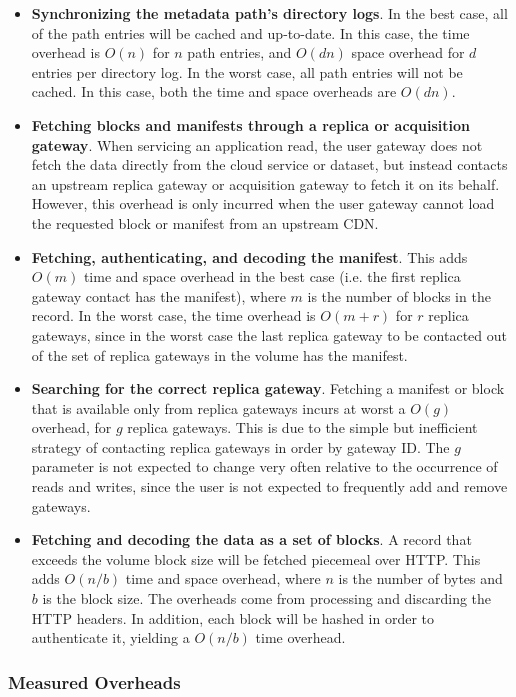 \begin{itemize}
\item \textbf{Synchronizing the metadata path's directory logs}.
In the best case, all of the path entries will be cached and up-to-date.  In
this case, the time overhead is $O(n)$ for $n$ path entries, and $O(dn)$ space
overhead for $d$ entries per directory log.  In the worst case,
all path entries will not be cached.  In this case, both the time and space
overheads are $O(dn)$.
\item \textbf{Fetching blocks and manifests through a replica or acquisition gateway}.  When
servicing an application read, the user gateway does not fetch the data directly
from the cloud service or dataset, but instead contacts an upstream replica
gateway or acquisition gateway to
fetch it on its behalf.  However, this overhead is only
incurred when the user gateway cannot load the requested block or manifest from
an upstream CDN.
\item \textbf{Fetching, authenticating, and decoding the manifest}.
This adds $O(m)$ time and space overhead in the best case (i.e. the first
replica gateway contact has the manifest),
where $m$ is the number of blocks in the record.  In the worst case, the time overhead is
$O(m+r)$ for $r$ replica gateways, since in the worst case the last replica
gateway to be contacted out of the set of replica gateways in the volume
has the manifest.
\item \textbf{Searching for the correct replica gateway}.  Fetching a manifest
or block that is available only from replica gateways incurs at worst a $O(g)$
overhead, for $g$ replica gateways.  This is due to the simple but inefficient
strategy of contacting replica gateways in order by gateway ID.  The $g$
parameter is not expected to change very often relative to the occurrence of reads and
writes, since the user is not expected to frequently add and remove gateways.
\item \textbf{Fetching and decoding the data as a set of blocks}.  A record that exceeds the
volume block size will be fetched piecemeal over HTTP.  This adds $O(n/b)$ time
and space overhead, where $n$ is the number of bytes and $b$ is the block size.
The overheads come from processing and discarding the HTTP headers.  In
addition, each block will be hashed in order to authenticate it,
yielding a $O(n/b)$ time overhead.
\end{itemize}

\subsubsection{Measured Overheads}

